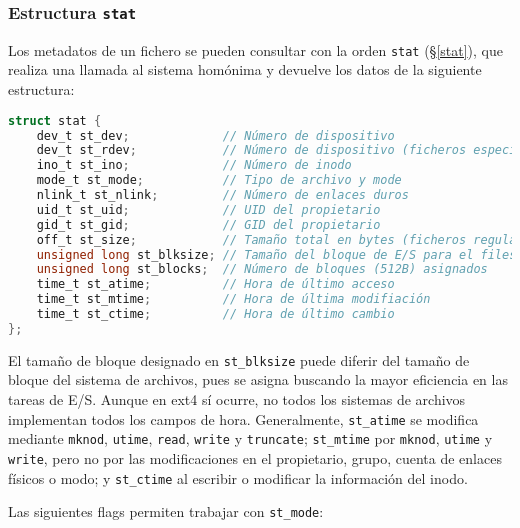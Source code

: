 \subsubsection{Estructura \texttt{stat}}

Los metadatos de un fichero se pueden consultar con la orden \texttt{stat} (\S\ref{stat}), que realiza una llamada al sistema homónima y devuelve los datos de la siguiente estructura:

\begin{lstlisting}[language=C]
struct stat {
	dev_t st_dev;             // Número de dispositivo
	dev_t st_rdev;            // Número de dispositivo (ficheros especiales)
	ino_t st_ino;             // Número de inodo
	mode_t st_mode;           // Tipo de archivo y mode
	nlink_t st_nlink;         // Número de enlaces duros
	uid_t st_uid;             // UID del propietario
	gid_t st_gid;             // GID del propietario
	off_t st_size;            // Tamaño total en bytes (ficheros regulares)
	unsigned long st_blksize; // Tamaño del bloque de E/S para el filesystem
	unsigned long st_blocks;  // Número de bloques (512B) asignados
	time_t st_atime;          // Hora de último acceso
	time_t st_mtime;          // Hora de última modifiación
	time_t st_ctime;          // Hora de último cambio
};
\end{lstlisting}

El tamaño de bloque designado en \texttt{st\_blksize} puede diferir del tamaño de bloque del sistema de archivos, pues se asigna buscando la mayor eficiencia en las tareas de E/S.
Aunque en ext4 sí ocurre, no todos los sistemas de archivos implementan todos los campos de hora.
Generalmente, \texttt{st\_atime} se modifica mediante \texttt{mknod}, \texttt{utime}, \texttt{read}, \texttt{write} y \texttt{truncate}; \texttt{st\_mtime} por \texttt{mknod}, \texttt{utime} y \texttt{write}, pero no por las modificaciones en el propietario, grupo, cuenta de enlaces físicos o modo; y \texttt{st\_ctime} al escribir o modificar la información  del inodo.

Las siguientes flags permiten trabajar con \texttt{st\_mode}:

